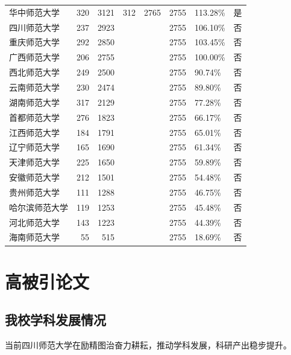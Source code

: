 \documentclass[cn, 11pt, fancy, hide]{elegantbook}
\begin{document}
\begin{table}[!h]
\begin{tabular}[t]{lrrrrrll}
华中师范大学 & 320 & 3121 & 312 & 2765 & 2755 & 113.28\% & 是\\
\addlinespace
四川师范大学 & 237 & 2923 &  &  & 2755 & 106.10\% & 否\\
重庆师范大学 & 292 & 2850 &  &  & 2755 & 103.45\% & 否\\
广西师范大学 & 206 & 2755 &  &  & 2755 & 100.00\% & 否\\
西北师范大学 & 249 & 2500 &  &  & 2755 & 90.74\% & 否\\
云南师范大学 & 230 & 2474 &  &  & 2755 & 89.80\% & 否\\
\addlinespace
湖南师范大学 & 317 & 2129 &  &  & 2755 & 77.28\% & 否\\
首都师范大学 & 276 & 1823 &  &  & 2755 & 66.17\% & 否\\
江西师范大学 & 184 & 1791 &  &  & 2755 & 65.01\% & 否\\
辽宁师范大学 & 165 & 1690 &  &  & 2755 & 61.34\% & 否\\
天津师范大学 & 225 & 1650 &  &  & 2755 & 59.89\% & 否\\
\addlinespace
安徽师范大学 & 212 & 1501 &  &  & 2755 & 54.48\% & 否\\
贵州师范大学 & 111 & 1288 &  &  & 2755 & 46.75\% & 否\\
哈尔滨师范大学 & 119 & 1253 &  &  & 2755 & 45.48\% & 否\\
河北师范大学 & 143 & 1223 &  &  & 2755 & 44.39\% & 否\\
海南师范大学 & 55 & 515 &  &  & 2755 & 18.69\% & 否\\
\bottomrule
\end{tabular}
\end{table}

\hypertarget{highly}{%
\chapter{高被引论文}\label{highly}}

\hypertarget{ux6211ux6821ux5b66ux79d1ux53d1ux5c55ux60c5ux51b5}{%
\section{我校学科发展情况}\label{ux6211ux6821ux5b66ux79d1ux53d1ux5c55ux60c5ux51b5}}

当前四川师范大学在励精图治奋力耕耘，推动学科发展，科研产出稳步提升。
\end{document}
